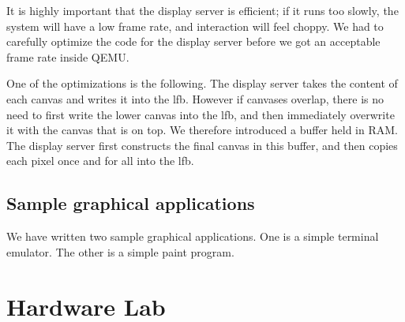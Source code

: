 \documentclass{article}
\begin{document}
It is highly important that the display server is efficient; if it runs too
slowly, the system will have a low frame rate, and interaction will feel
choppy. We had to carefully optimize the code for the display server before we
got an acceptable frame rate inside QEMU.

One of the optimizations is the following. The display server takes the
content of each canvas and writes it into the \gls{lfb}. However if
canvases overlap, there is no need to first write the lower canvas into the
\gls{lfb}, and then immediately overwrite it with the canvas that is on top.
We therefore introduced a buffer held in RAM. The display server first
constructs the final canvas in this buffer, and then copies each pixel once
and for all into the \gls{lfb}.



\subsection{Sample graphical applications}
We have written two sample graphical applications. One is a simple terminal
emulator. The other is a simple paint program.




\section{Hardware Lab}
\end{document}
